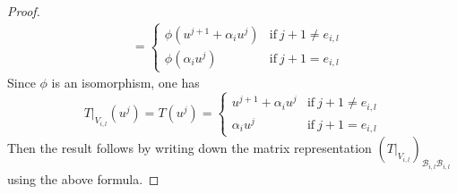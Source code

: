 \documentclass[11pt,openany]{book}
\theoremstyle{plain}
\newtheorem{corollary}[corollary]{Corollary}
\theoremstyle{definition}
\theoremstyle{remark}
\begin{document}
\begin{proof}
\begin{align*}
&= \begin{cases} \phi(u^{j+1} + \alpha_i u^j) & \text{if}\ j+1 \neq e_{i,l} \\
\phi( \alpha_i u^j) & \text{if}\ j+1 = e_{i,l} \end{cases} 
\end{align*}
Since $\phi$ is an isomorphism, one has
$$ T|_{V_{i,l}}(u^j) = T(u^j) = \begin{cases} u^{j+1} + \alpha_i u^j & \text{if}\ j+1 \neq e_{i,l} \\
\alpha_i u^j & \text{if}\ j+1 = e_{i,l} \end{cases} $$
Then the result follows by writing down the matrix representation $(T|_{V_{i,l}})_{\mathcal{B}_{i,l}\mathcal{B}_{i,l}}$ using the above formula.
\end{proof}

\end{document}
